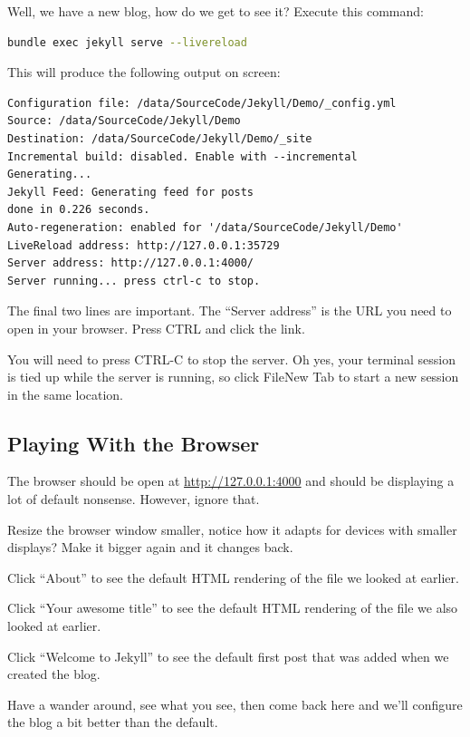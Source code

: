 Well, we have a new blog, how do we get to see it? Execute this command:

\begin{lstlisting}[style=myStyle,language=bash]
bundle exec jekyll serve --livereload
\end{lstlisting}

This will produce the following output on screen:

\begin{lstlisting}[style=myText]
Configuration file: /data/SourceCode/Jekyll/Demo/_config.yml
Source: /data/SourceCode/Jekyll/Demo
Destination: /data/SourceCode/Jekyll/Demo/_site
Incremental build: disabled. Enable with --incremental
Generating...
Jekyll Feed: Generating feed for posts
done in 0.226 seconds.
Auto-regeneration: enabled for '/data/SourceCode/Jekyll/Demo'
LiveReload address: http://127.0.0.1:35729
Server address: http://127.0.0.1:4000/
Server running... press ctrl-c to stop.
\end{lstlisting}

The final two lines are important. The ``Server address'' is the URL you need to open in your browser. Press CTRL and click the link.

You will need to press CTRL-C to stop the server. Oh yes, your terminal session is tied up while the server is running, so click File\lyxarrow{}New Tab to start a new session in the same location.

\subsection{Playing With the Browser}\label{sect: Playing With the Browser}

The browser should be open at \url{http://127.0.0.1:4000} and should be displaying a lot of default nonsense. However, ignore that.

Resize the browser window smaller, notice how it adapts for devices with smaller displays? Make it bigger again and it changes back.

Click ``About'' to see the default HTML rendering of the  file we looked at earlier.

Click ``Your awesome title'' to see the default HTML rendering of the  file we also looked at earlier.

Click ``Welcome to Jekyll'' to see the default first post that was added when we created the blog.

Have a wander around, see what you see, then come back here and we'll configure the blog a bit better than the default.


